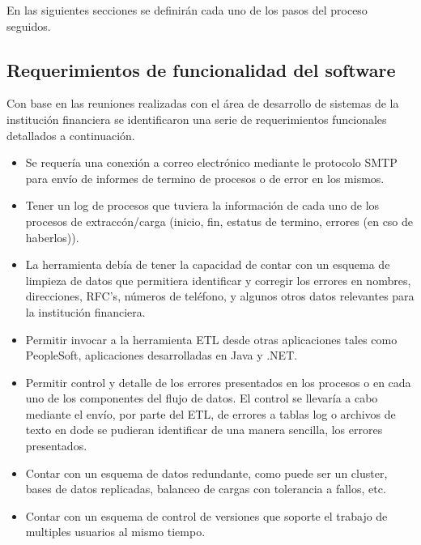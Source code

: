 En las siguientes secciones se definirán cada uno de los pasos del proceso
seguidos.

\subsection{Requerimientos de funcionalidad del software}

Con base en las reuniones realizadas con el área de desarrollo de sistemas de la
institución financiera se identificaron una serie de requerimientos funcionales
detallados a continuación.

\begin{itemize}

\item Se requería una conexión a correo electrónico mediante le protocolo SMTP
  para envío de informes de termino de procesos o de error en los mismos.

\item Tener un log de procesos que tuviera la información de cada uno de los
  procesos de extraccón/carga (inicio, fin, estatus de termino, errores (en cso
  de haberlos)).

\item La herramienta debía de tener la capacidad de contar con un esquema de
  limpieza de datos que permitiera identificar y corregir los errores en
  nombres, direcciones, RFC's, números de teléfono, y algunos otros datos
  relevantes para la institución financiera.

\item Permitir invocar a la herramienta ETL desde otras aplicaciones tales como
  PeopleSoft, aplicaciones desarrolladas en Java y .NET.

\item Permitir control y detalle de los errores presentados en los procesos o en
  cada uno de los componentes del flujo de datos. El control se llevaría a cabo
  mediante el envío, por parte del ETL, de errores a tablas log o archivos de
  texto en dode se pudieran identificar de una manera sencilla, los errores
  presentados.

\item Contar con un esquema de datos redundante, como puede ser un cluster,
  bases de datos replicadas, balanceo de cargas con tolerancia a fallos, etc.

\item Contar con un esquema de control de versiones que soporte el trabajo de
  multiples usuarios al mismo tiempo.


\end{itemize}
